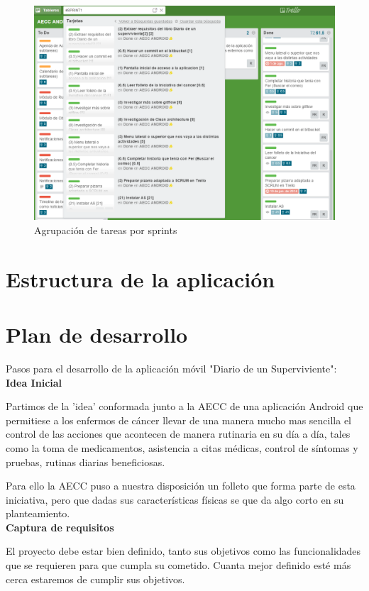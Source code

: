 \documentclass[../pfc.tex]{subfiles}
\begin{document}
		\begin{figure}[H]
			\centering
			\includegraphics[width=1\linewidth]{../images/sprints2}
			\caption{Agrupación de tareas por sprints}
			\label{fig:sprints}
		\end{figure}

	
	\section{Estructura de la aplicación}
	
	\section{Plan de desarrollo}
	Pasos para el desarrollo de la aplicación móvil "Diario de un Superviviente":\\
	
	\textbf{Idea Inicial}
	
	Partimos de la 'idea' conformada junto a la AECC de una aplicación Android  que permitiese a los enfermos de cáncer llevar de una manera mucho mas sencilla el control de las acciones que acontecen de manera rutinaria en su día a día, tales como la toma de medicamentos, asistencia a citas médicas, control de síntomas y pruebas, rutinas diarias beneficiosas.
	
	Para ello la AECC puso a nuestra disposición un folleto que forma parte de esta iniciativa, pero que dadas sus características físicas se que da algo corto en su planteamiento.\\
	
	\textbf{Captura de requisitos}
	
	El proyecto debe estar bien definido, tanto sus objetivos como las funcionalidades que se requieren para que cumpla su cometido. Cuanta mejor definido esté más cerca estaremos de cumplir sus objetivos.
	
\end{document}
